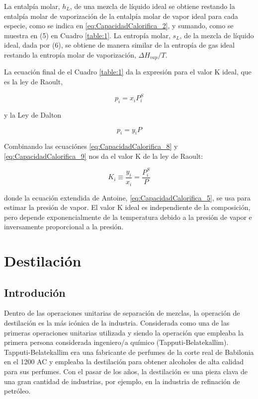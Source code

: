 \documentclass[11pt]{book}
\begin{document}
La entalpía molar, $h_L$, de una mezcla de líquido ideal se obtiene restando la entalpía molar de vaporización de la entalpía molar de vapor ideal para cada especie, como se indica en \ref{eq:CapacidadCalorifica_2}, y sumando, como se muestra en (5) en Cuadro \ref{table:1}. La entropía molar, $s_L$, de la mezcla de líquido ideal, dada por (6), se obtiene de manera similar de la entropía de gas ideal restando la entropía molar de vaporización, $\Delta H_{vap}/T$.

La ecuación final de el Cuadro \ref{table:1} da la expresión para el valor K ideal, que es la ley de Raoult,

\begin{equation}
    \label{eq:CapacidadCalorifica_8}
    p_i = x_i P_i^S
\end{equation}

y la Ley de Dalton

\begin{equation}
    \label{eq:CapacidadCalorifica_9}
    p_i = y_i P
\end{equation}

Combinando las ecuaciónes \ref{eq:CapacidadCalorifica_8} y \ref{eq:CapacidadCalorifica_9} nos da el valor K de la ley de Raoult: 

\begin{equation}
    \label{eq:CapacidadCalorifica_10}
    K_i \equiv \frac{y_i}{x_i} = \frac{P_i^S}{P}
\end{equation}

donde la ecuación extendida de Antoine, \ref{eq:CapacidadCalorifica_5}, se usa para estimar la presión de vapor. El valor K ideal es independiente de la composición, pero depende exponencialmente de la temperatura debido a la presión de vapor e inversamente proporcional a la presión.


\chapter{Destilación}

\section{Introdución}

Dentro de las operaciones unitarias de separación de mezclas, la operación de destilación es la más icónica de la industria. Considerada como una de las primeras operaciones unitarias utilizada y siendo la operación que empleaba la primera persona considerada ingeniero/a químico (Tapputi-Belatekallim). Tapputi-Belatekallim era una fabricante de perfumes de la corte real de Babilonia en el 1200 AC y empleaba la destilación para obtener alcoholes de alta calidad para sus perfumes. Con el pasar de los años, la destilación es una pieza clava de una gran cantidad de industrias, por ejemplo, en la industria de refinación de petróleo.
\end{document}
